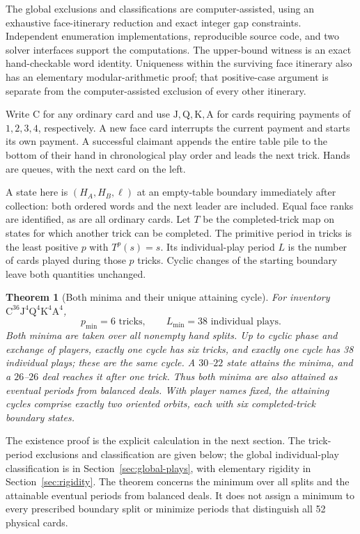 \documentclass[11pt]{article}
\newtheorem{theorem}{Theorem}
\newcommand{\CC}{\mathrm C}
\newcommand{\JJ}{\mathrm J}
\newcommand{\QQ}{\mathrm Q}
\newcommand{\KK}{\mathrm K}
\renewcommand{\AA}{\mathrm A}
\begin{document}
The global exclusions and classifications are computer-assisted, using an
exhaustive face-itinerary reduction and exact integer gap constraints.
Independent enumeration implementations, reproducible source code, and two
solver interfaces support the computations. The upper-bound witness is an
exact hand-checkable word identity. Uniqueness within the surviving face
itinerary also has an elementary modular-arithmetic proof; that positive-case
argument is separate from the computer-assisted exclusion of every other
itinerary.


Write $\CC$ for any ordinary card and use $\JJ,\QQ,\KK,\AA$ for cards requiring
payments of $1,2,3,4$, respectively. A new face card interrupts the current
payment and starts its own payment. A successful claimant appends the entire
table pile to the bottom of their hand in chronological play order and leads
the next trick. Hands are queues, with the next card on the left.

A state here is $(H_A,H_B,\ell)$ at an empty-table boundary immediately after
collection: both ordered words and the next leader are included. Equal face
ranks are identified, as are all ordinary cards. Let $T$ be the completed-trick
map on states for which another trick can be completed. The primitive period
in tricks is the least positive $p$ with $T^p(s)=s$. Its individual-play
period $L$ is the number of cards played during those $p$ tricks. Cyclic
changes of the starting boundary leave both quantities unchanged.

\begin{theorem}[Both minima and their unique attaining cycle]\label{thm:main}
For inventory $\CC^{36}\JJ^4\QQ^4\KK^4\AA^4$,
\[
\boxed{p_{\min}=6\text{ tricks},\qquad L_{\min}=38\text{ individual plays}.}
\]
Both minima are taken over all nonempty hand splits. Up to cyclic phase and
exchange of players, exactly one cycle has six tricks, and exactly one cycle
has 38 individual plays; these are the same cycle. A $30$--$22$ state attains
the minima, and a $26$--$26$ deal reaches it after one trick. Thus both minima
are also attained as eventual periods from balanced deals. With player names
fixed, the attaining cycles comprise exactly two oriented orbits, each with
six completed-trick boundary states.
\end{theorem}

The existence proof is the explicit calculation in the next section.
The trick-period exclusions and classification are given below; the global
individual-play classification is in Section~\ref{sec:global-plays}, with
elementary rigidity in Section~\ref{sec:rigidity}. The theorem concerns the
minimum over all splits and the attainable eventual periods from balanced
deals. It does not assign a minimum to every prescribed boundary split or
minimize periods that distinguish all 52 physical cards.
\end{document}
